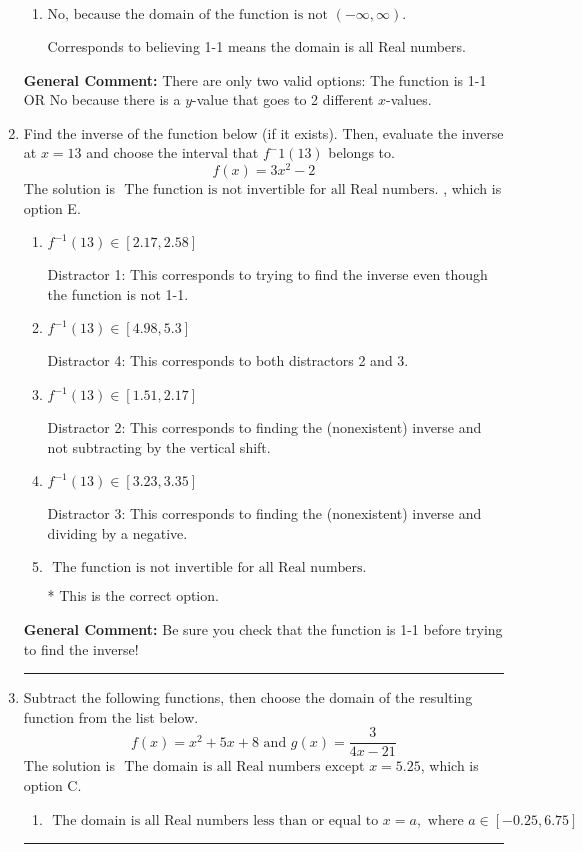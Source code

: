 \documentclass{extbook}[14pt]
\newcommand{\litem}[1]{\item #1

\rule{\textwidth}{0.4pt}}
\begin{document}
\begin{enumerate}
{\begin{enumerate}[label=\Alph*.]
Corresponds to the Vertical Line test, which checks if an expression is a function.
\item \( \text{No, because the domain of the function is not $(-\infty, \infty)$.} \)

Corresponds to believing 1-1 means the domain is all Real numbers.
\end{enumerate}

\textbf{General Comment:} There are only two valid options: The function is 1-1 OR No because there is a $y$-value that goes to 2 different $x$-values.
}
\litem{
Find the inverse of the function below (if it exists). Then, evaluate the inverse at $x = 13$ and choose the interval that $f^-1(13)$ belongs to.
\[ f(x) = 3 x^2 - 2 \]The solution is \( \text{ The function is not invertible for all Real numbers. } \), which is option E.\begin{enumerate}[label=\Alph*.]
\item \( f^{-1}(13) \in [2.17, 2.58] \)

 Distractor 1: This corresponds to trying to find the inverse even though the function is not 1-1. 
\item \( f^{-1}(13) \in [4.98, 5.3] \)

 Distractor 4: This corresponds to both distractors 2 and 3.
\item \( f^{-1}(13) \in [1.51, 2.17] \)

 Distractor 2: This corresponds to finding the (nonexistent) inverse and not subtracting by the vertical shift.
\item \( f^{-1}(13) \in [3.23, 3.35] \)

 Distractor 3: This corresponds to finding the (nonexistent) inverse and dividing by a negative.
\item \( \text{ The function is not invertible for all Real numbers. } \)

* This is the correct option.
\end{enumerate}

\textbf{General Comment:} Be sure you check that the function is 1-1 before trying to find the inverse!
}
\litem{
Subtract the following functions, then choose the domain of the resulting function from the list below.
\[ f(x) = x^{2} +5 x + 8 \text{ and } g(x) = \frac{3}{4x-21} \]The solution is \( \text{ The domain is all Real numbers except } x = 5.25 \), which is option C.\begin{enumerate}[label=\Alph*.]
\item \( \text{ The domain is all Real numbers less than or equal to } x = a, \text{ where } a \in [-0.25, 6.75] \)



\end{enumerate}}
\end{enumerate}
\end{document}
